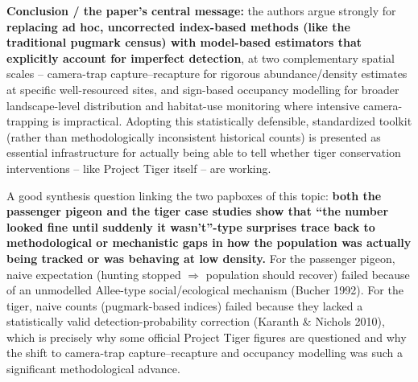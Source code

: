 \documentclass[11pt,a4paper]{article}
\begin{document}
\begin{papbox}
\textbf{Conclusion / the paper's central message:} the authors argue strongly for \textbf{replacing ad hoc, uncorrected index-based methods (like the traditional pugmark census) with model-based estimators that explicitly account for imperfect detection}, at two complementary spatial scales -- camera-trap capture--recapture for rigorous abundance/density estimates at specific well-resourced sites, and sign-based occupancy modelling for broader landscape-level distribution and habitat-use monitoring where intensive camera-trapping is impractical. Adopting this statistically defensible, standardized toolkit (rather than methodologically inconsistent historical counts) is presented as essential infrastructure for actually being able to tell whether tiger conservation interventions -- like Project Tiger itself -- are working.
\end{papbox}

\begin{exambox}
A good synthesis question linking the two papboxes of this topic: \textbf{both the passenger pigeon and the tiger case studies show that ``the number looked fine until suddenly it wasn't''-type surprises trace back to methodological or mechanistic gaps in how the population was actually being tracked or was behaving at low density.} For the passenger pigeon, naive expectation (hunting stopped $\Rightarrow$ population should recover) failed because of an unmodelled Allee-type social/ecological mechanism (Bucher 1992). For the tiger, naive counts (pugmark-based indices) failed because they lacked a statistically valid detection-probability correction (Karanth \& Nichols 2010), which is precisely why some official Project Tiger figures are questioned and why the shift to camera-trap capture--recapture and occupancy modelling was such a significant methodological advance.
\end{exambox}
\end{document}
